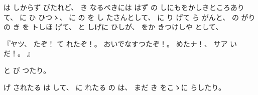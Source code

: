 は
しからず
びたれど、
%
き
なるべきには
はず
の
しにもをかしきところありて、
%
に
ひ
ひつゝ、
%
に
の
を
し
たさんとして、
%
に
り
げて
ら
がんと、
%
の
がりの
き
を
トしほ
げて、
%
と
しげに
ひしが、
%
をか
きつけしや
として、

『ヤツ、
%
たぞ！
て
れたぞ！。
%
おいでなすつたぞ！。
%
めたナ！、
%
サア
いだ！。
』

と
び
つたり。

げ
されたる
は
して、
%
に
れたる
の
は、
%
まだ
き
をこゝに
らしたり。
